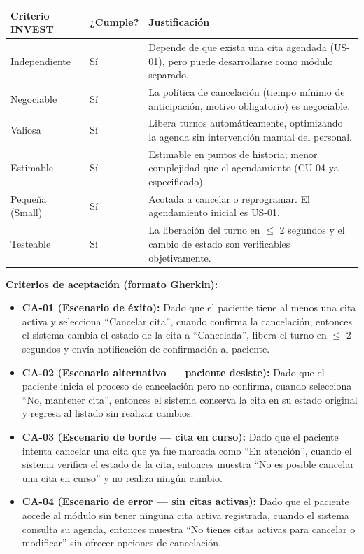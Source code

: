 \documentclass[11pt,a4paper]{article}
\providecommand{\tightlist}{%
	\setlength{\itemsep}{0pt}\setlength{\parskip}{0pt}}
\begin{document}
	\begin{longtable}{p{} p{} p{}}
		
		
		\toprule
		\textbf{Criterio INVEST} &
		\textbf{¿Cumple?} &
		\textbf{Justificación} \\
		\midrule
		\endhead
		
		Independiente & Sí & Depende de que exista una cita agendada (US-01), pero puede desarrollarse como módulo separado. \\
		Negociable & Sí & La política de cancelación (tiempo mínimo de anticipación, motivo obligatorio) es negociable. \\
		Valiosa & Sí & Libera turnos automáticamente, optimizando la agenda sin intervención manual del personal. \\
		Estimable & Sí & Estimable en puntos de historia; menor complejidad que el agendamiento (CU-04 ya especificado). \\
		Pequeña (Small) & Sí & Acotada a cancelar o reprogramar. El agendamiento inicial es US-01. \\
		Testeable & Sí & La liberación del turno en \(\leq\) 2 segundos y el cambio de estado son verificables objetivamente. \\
		\bottomrule
	\end{longtable}
	
	\textbf{Criterios de aceptación (formato Gherkin):}
	
	\begin{itemize}
		\tightlist
		\item
		\textbf{CA-01 (Escenario de éxito):} Dado que el paciente tiene al menos una cita activa y selecciona ``Cancelar cita'', cuando confirma la cancelación, entonces el sistema cambia el estado de la cita a ``Cancelada'', libera el turno en \(\leq\) 2 segundos y envía notificación de confirmación al paciente.
		\item
		\textbf{CA-02 (Escenario alternativo --- paciente desiste):} Dado que el paciente inicia el proceso de cancelación pero no confirma, cuando selecciona ``No, mantener cita'', entonces el sistema conserva la cita en su estado original y regresa al listado sin realizar cambios.
		\item
		\textbf{CA-03 (Escenario de borde --- cita en curso):} Dado que el paciente intenta cancelar una cita que ya fue marcada como ``En atención'', cuando el sistema verifica el estado de la cita, entonces muestra ``No es posible cancelar una cita en curso'' y no realiza ningún cambio.
		\item
		\textbf{CA-04 (Escenario de error --- sin citas activas):} Dado que el paciente accede al módulo sin tener ninguna cita activa registrada, cuando el sistema consulta su agenda, entonces muestra ``No tienes citas activas para cancelar o modificar'' sin ofrecer opciones de cancelación.
	\end{itemize}
	
\end{document}
